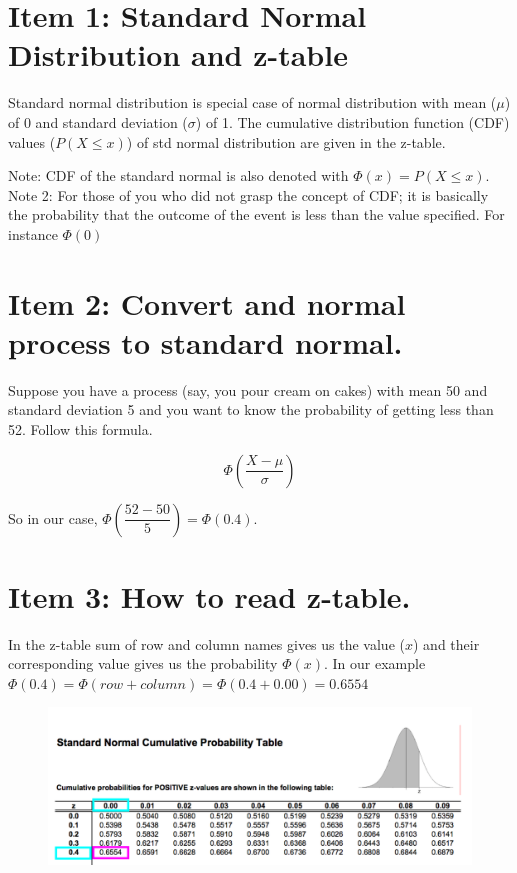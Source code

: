 \documentclass[]{book}
\theoremstyle{definition}
\theoremstyle{definition}
\theoremstyle{definition}
\theoremstyle{remark}
\begin{document}
\hypertarget{item-1-standard-normal-distribution-and-z-table}{%
\section{Item 1: Standard Normal Distribution and
z-table}\label{item-1-standard-normal-distribution-and-z-table}}

Standard normal distribution is special case of normal distribution with
mean (\(\mu\)) of 0 and standard deviation (\(\sigma\)) of 1. The
cumulative distribution function (CDF) values (\(P(X \le x)\)) of std
normal distribution are given in the z-table.

Note: CDF of the standard normal is also denoted with
\(\Phi(x) = P(X \le x)\). Note 2: For those of you who did not grasp the
concept of CDF; it is basically the probability that the outcome of the
event is less than the value specified. For instance \(\Phi(0)\)

\hypertarget{item-2-convert-and-normal-process-to-standard-normal.}{%
\section{Item 2: Convert and normal process to standard
normal.}\label{item-2-convert-and-normal-process-to-standard-normal.}}

Suppose you have a process (say, you pour cream on cakes) with mean 50
and standard deviation 5 and you want to know the probability of getting
less than 52. Follow this formula.

\[\Phi \left(\dfrac{X-\mu}{\sigma}\right)\]

So in our case, \(\Phi \left(\dfrac{52-50}{5}\right) = \Phi(0.4)\).

\hypertarget{item-3-how-to-read-z-table.}{%
\section{Item 3: How to read
z-table.}\label{item-3-how-to-read-z-table.}}

In the z-table sum of row and column names gives us the value (\(x\))
and their corresponding value gives us the probability \(\Phi(x)\). In
our example
\(\Phi(0.4) = \Phi(row + column) = \Phi(0.4 + 0.00) = 0.6554\)

\begin{figure}
\begin{center}
\includegraphics[width=0.95\columnwidth]{img/ss1}
\end{center}
\end{figure}
\end{document}
